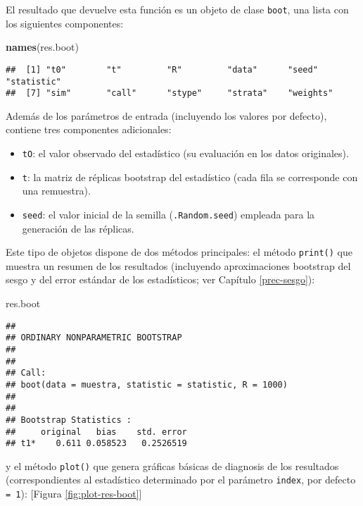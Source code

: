 \documentclass[
]{book}
\newenvironment{Shaded}{\begin{snugshade}}{\end{snugshade}}
\newcommand{\KeywordTok}[1]{\textcolor[rgb]{0.13,0.29,0.53}{\textbf{#1}}}
\newcommand{\NormalTok}[1]{#1}
\theoremstyle{break}
\theoremstyle{definition}
\theoremstyle{definition}
\theoremstyle{definition}
\theoremstyle{remark}
\begin{document}
El resultado que devuelve esta función es un objeto de clase \texttt{boot}, una lista con los siguientes componentes:

\begin{Shaded}
\begin{Highlighting}[]
\KeywordTok{names}\NormalTok{(res.boot)}
\end{Highlighting}
\end{Shaded}

\begin{verbatim}
##  [1] "t0"        "t"         "R"         "data"      "seed"      "statistic"
##  [7] "sim"       "call"      "stype"     "strata"    "weights"
\end{verbatim}

Además de los parámetros de entrada (incluyendo los valores por defecto), contiene tres componentes adicionales:

\begin{itemize}
\item
  \texttt{tO}: el valor observado del estadístico
  (su evaluación en los datos originales).
\item
  \texttt{t}: la matriz de réplicas bootstrap del estadístico
  (cada fila se corresponde con una remuestra).
\item
  \texttt{seed}: el valor inicial de la semilla (\texttt{.Random.seed})
  empleada para la generación de las réplicas.
\end{itemize}

Este tipo de objetos dispone de dos métodos principales:
el método \texttt{print()} que muestra un resumen de los resultados
(incluyendo aproximaciones bootstrap del sesgo y del error
estándar de los estadísticos; ver Capítulo \ref{prec-sesgo}):

\begin{Shaded}
\begin{Highlighting}[]
\NormalTok{res.boot}
\end{Highlighting}
\end{Shaded}

\begin{verbatim}
## 
## ORDINARY NONPARAMETRIC BOOTSTRAP
## 
## 
## Call:
## boot(data = muestra, statistic = statistic, R = 1000)
## 
## 
## Bootstrap Statistics :
##     original   bias    std. error
## t1*    0.611 0.058523   0.2526519
\end{verbatim}

y el método \texttt{plot()} que genera gráficas básicas de diagnosis
de los resultados (correspondientes al estadístico determinado por el parámetro \texttt{index}, por defecto \texttt{=\ 1}): {[}Figura \ref{fig:plot-res-boot}{]}
\end{document}
